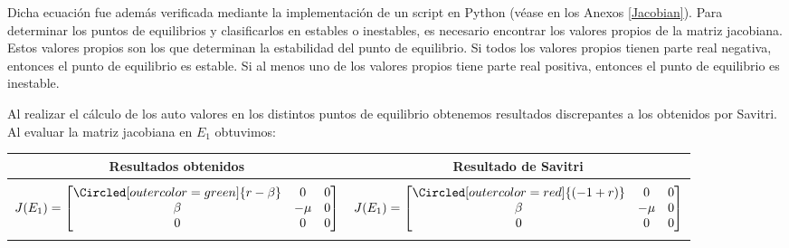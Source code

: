 \documentclass{wscpaperproc}
\theoremstyle{wsc}
\begin{document}
Dicha ecuación fue además verificada mediante la implementaci\'on de un script en Python (v\'ease en los Anexos \ref{Jacobian}).
Para determinar los puntos de equilibrios y clasificarlos en estables o inestables, es necesario encontrar los valores propios
de la matriz jacobiana. Estos valores propios son los que determinan la estabilidad del punto de equilibrio. Si todos los valores
propios tienen parte real negativa, entonces el punto de equilibrio es estable. Si al menos uno de los valores propios tiene parte real positiva,
entonces el punto de equilibrio es inestable. \par
Al realizar el c\'alculo de los auto valores en los distintos puntos de equilibrio obtenemos resultados discrepantes a los obtenidos por Savitri.
Al evaluar la matriz jacobiana en $E_1$ obtuvimos:\\
\begin{center}
	\begin{tabular}{ c c }
		\toprule
		\textbf{Resultados obtenidos}                        & \textbf{Resultado de Savitri} \\
		\midrule                                                                             \\
		\addlinespace[-2ex]
		$J(E_1) =\label{Characteristic000t} \begin{bmatrix}
				                                    \Circled[outer color=green]{r-\beta} & 0    & 0 \\
				                                    \beta                                & -\mu & 0 \\
				                                    0                                    & 0    & 0
			                                    \end{bmatrix}$ &
		$J(E_1) =\label{Characteristic000f} \begin{bmatrix}
				                                    \Circled[outer color=red]{(-1+ r) } & 0    & 0 \\
				                                    \beta                               & -\mu & 0 \\
				                                    0                                   & 0    & 0
			                                    \end{bmatrix}$   \\
		\addlinespace[1.5ex]

		\bottomrule
	\end{tabular}
\end{center}
\bigskip
\end{document}
